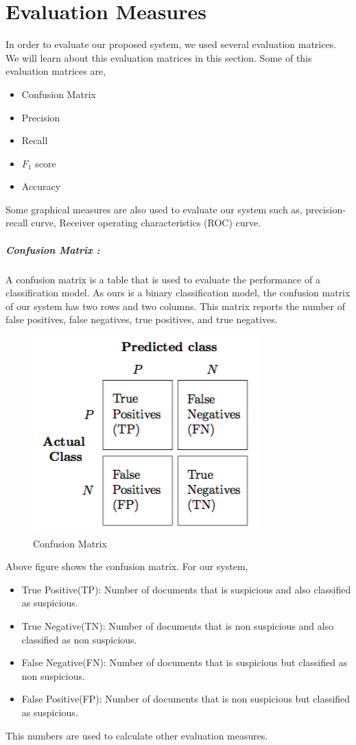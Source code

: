 \section{Evaluation Measures}
In order to evaluate our proposed system, we used several evaluation matrices. We will learn about this  evaluation matrices in this section. Some of this evaluation matrices are,
\begin{itemize}
    \item Confusion Matrix
    \item Precision
    \item Recall
    \item $F_1$ score
    \item Accuracy 
\end{itemize}
Some graphical measures are also used to evaluate our system such as, precision-recall curve, Receiver operating characteristics (ROC) curve.
\clearpage
\subparagraph{Confusion Matrix :}
A confusion matrix is a table that is used to evaluate the performance of a classification model. As ours is a binary classification model, the confusion matrix of our system has two rows and two columns. This matrix reports the number of false positives, false negatives, true positives, and true negatives.

\begin{figure}[h!]
    \centering
    \includegraphics[scale=0.55]{Figures/confusion_matrix_1.png}
    \caption{Confusion Matrix}
    \label{fig:CM}
\end{figure}
\noindent
Above figure shows the confusion matrix. For our system,
\begin{itemize}
    \item True Positive(TP): Number of documents that is suspicious and also classified as suspicious.
    \item True Negative(TN): Number of documents that is non suspicious and also classified as non suspicious.
    \item False Negative(FN): Number of documents that is suspicious but classified as non suspicious.
    \item False Positive(FP): Number of documents that is non suspicious but classified as suspicious. 
\end{itemize}
\noindent
This numbers are used to calculate other evaluation measures.

